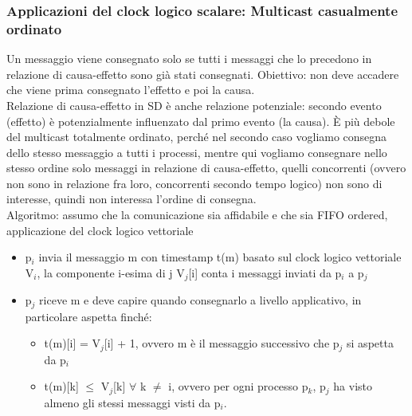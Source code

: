\documentclass[16px]{article}
\begin{document}
\subsubsection{Applicazioni del clock logico scalare: Multicast casualmente ordinato}
Un messaggio viene consegnato solo se tutti i messaggi che lo precedono in relazione di causa-effetto sono già stati consegnati. Obiettivo: non deve accadere che viene prima consegnato l'effetto e poi la causa.\\ Relazione di causa-effetto in SD è anche relazione potenziale: secondo evento (effetto) è potenzialmente influenzato dal primo evento (la causa). È più debole del multicast totalmente ordinato, perché nel secondo caso vogliamo consegna dello stesso messaggio a tutti i processi, mentre qui vogliamo consegnare nello stesso ordine solo messaggi in relazione di causa-effetto, quelli concorrenti (ovvero non sono in relazione fra loro, concorrenti secondo tempo logico) non sono di interesse, quindi non interessa l'ordine di consegna.\\ Algoritmo: assumo che la comunicazione sia affidabile e che sia FIFO ordered, applicazione del clock logico vettoriale
\begin{itemize}
\item p$_i$ invia il messaggio m con timestamp t(m) basato sul clock logico vettoriale V$_i$, la componente i-esima di j V$_j$[i] conta i messaggi inviati da p$_i$ a p$_j$
\item p$_j$ riceve m e deve capire quando consegnarlo a livello applicativo, in particolare aspetta finché:
\begin{itemize}
\item t(m)[i] = V$_j$[i] + 1, ovvero m è il messaggio successivo che p$_j$ si aspetta da p$_i$
\item t(m)[k] $\leq$ V$_j$[k] $\forall$ k $\neq$ i, ovvero per ogni processo p$_k$, p$_j$ ha visto almeno gli stessi messaggi visti da p$_i$.
\end{itemize}
\end{itemize}
\end{document}
